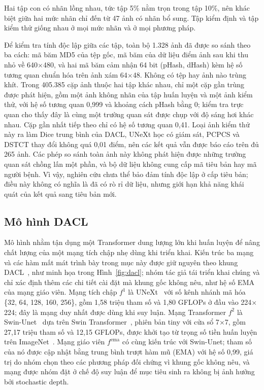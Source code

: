 \documentclass{IEEEtran}
\begin{document}


Hai tập con có nhãn lồng nhau, tức tập 5\% nằm trọn trong tập 10\%, nên khác biệt giữa hai mức nhãn chỉ đến từ 47 ảnh có nhãn bổ sung. Tập kiểm định và tập kiểm thử giống nhau ở mọi mức nhãn và ở mọi phương pháp.

Để kiểm tra tính độc lập giữa các tập, toàn bộ 1.328 ảnh đã được so sánh theo ba cách: mã băm MD5 của tệp gốc, mã băm của dữ liệu điểm ảnh sau khi thu nhỏ về 640$\times$480, và hai mã băm cảm nhận 64 bit (pHash, dHash) kèm hệ số tương quan chuẩn hóa trên ảnh xám 64$\times$48. Không có tệp hay ảnh nào trùng khít. Trong 405.385 cặp ảnh thuộc hai tập khác nhau, chỉ một cặp gần trùng được phát hiện, gồm một ảnh không nhãn của tập huấn luyện và một ảnh kiểm thử, với hệ số tương quan 0,999 và khoảng cách pHash bằng 0; kiểm tra trực quan cho thấy đây là cùng một trường quan sát được chụp với độ sáng hơi khác nhau. Cặp gần nhất tiếp theo chỉ có hệ số tương quan 0,41. Loại ảnh kiểm thử này ra làm Dice trung bình của DACL, UNeXt học có giám sát, PCPCS và DSTCT thay đổi không quá 0,01 điểm, nên các kết quả vẫn được báo cáo trên đủ 265 ảnh. Các phép so sánh toàn ảnh này không phát hiện được những trường quan sát chồng lấn một phần, và bộ dữ liệu không cung cấp mã tiêu bản hay mã người bệnh. Vì vậy, nghiên cứu chưa thể bảo đảm tính độc lập ở cấp tiêu bản; điều này không có nghĩa là đã có rò rỉ dữ liệu, nhưng giới hạn khả năng khái quát của kết quả sang tiêu bản mới.

\subsection{Mô hình DACL}
\label{sec:dacl}

Mô hình nhằm tận dụng một Transformer dung lượng lớn khi huấn luyện để nâng chất lượng của một mạng tích chập nhẹ dùng khi triển khai. Kiến trúc ba mạng và các hàm mất mát trình bày trong mục này được giữ nguyên theo khung DACL~\cite{dacl}, như minh họa trong Hình~\ref{fig:dacl}; nhóm tác giả tái triển khai chúng và chỉ xác định thêm các chi tiết cài đặt mà khung gốc không nêu, như hệ số EMA của mạng giáo viên. Mạng tích chập $f^1$ là UNeXt~\cite{unext} với số kênh nhánh mã hóa \{32, 64, 128, 160, 256\}, gồm 1,58 triệu tham số và 1,80 GFLOPs ở đầu vào 224$\times$224; đây là mạng duy nhất được dùng khi suy luận. Mạng Transformer $f^2$ là Swin-Unet~\cite{swinunet} dựa trên Swin Transformer~\cite{swin}, phiên bản tiny với cửa sổ 7$\times$7, gồm 27,17 triệu tham số và 12,15 GFLOPs, được khởi tạo từ trọng số tiền huấn luyện trên ImageNet~\cite{imagenet}. Mạng giáo viên $f^{\mathrm{ema}}$ có cùng kiến trúc với Swin-Unet; tham số của nó được cập nhật bằng trung bình trượt hàm mũ (EMA) với hệ số 0,99, giá trị do nhóm chọn theo các phương pháp đối chứng vì khung gốc không nêu, và mạng được nhóm đặt ở chế độ suy luận để mục tiêu sinh ra không bị ảnh hưởng bởi stochastic depth.
\end{document}
